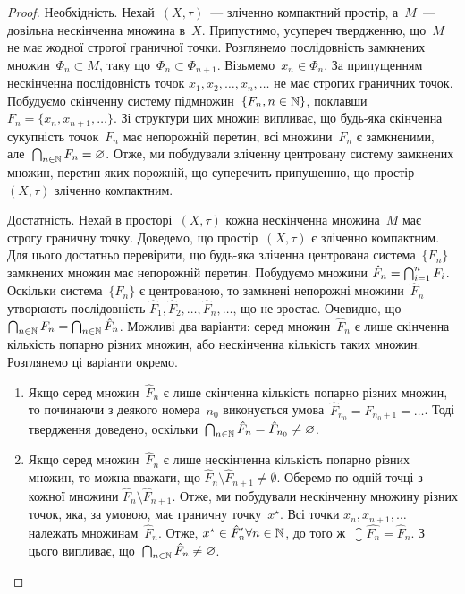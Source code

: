 \begin{proof}
Необхідність. Нехай~$(X, \tau)$~--- зліченно
компактний простір, а~$M$~--- довільна нескінченна множина
в~$X$. Припустимо, усупереч твердженню, що~$M$ не має
жодної строгої граничної точки. Розглянемо послідовність
замкнених множин~$\Phi_n \subset M$, таку що~$\Phi_n \subset \Phi_{n + 1}$.
Візьмемо~$x_n \in \Phi_n$.
За припущенням нескінченна послідовність точок
$x_1, x_2, \dots, x_n, \dots$ не має строгих граничних точок. Побудуємо
скінченну систему підмножин~$\{F_n, n \in \mathbb{N}\}$, поклавши
$F_n = \{x_n, x_{n+1}, \dots\}$. Зі структури цих множин випливає, що
будь-яка скінченна сукупність точок~$F_n$ має непорожній
перетин, всі множини~$F_n$ є замкненими,
але~$\operatorname*{\bigcap}_{n \in \mathbb{N}} F_n = \varnothing$.
Отже, ми побудували зліченну центровану систему
замкнених множин, перетин яких порожній, що суперечить
припущенню, що простір~$(X, \tau)$ зліченно компактним.

Достатність. Нехай в просторі~$(X, \tau)$ кожна
нескінченна множина~$M$ має строгу граничну точку.
Доведемо, що простір~$(X, \tau)$ є зліченно компактним. Для
цього достатньо перевірити, що будь-яка зліченна
центрована система~$\{F_n\}$ замкнених множин має
непорожній перетин. Побудуємо множини
$\hat F_n = \operatorname*{\bigcap}_{i = 1}^n F_i$.
Оскільки система~$\{F_n\}$ є центрованою, то замкнені
непорожні множини~$\hat F_n$ утворюють послідовність
$\hat F_1, \hat F_2, \dots, \hat F_n, \dots$, що не зростає.
Очевидно, що~$\operatorname*{\bigcap}_{n \in \mathbb{N}} F_n = \operatorname*{\bigcap}_{n \in \mathbb{N}} \hat F_n$.
Можливі два варіанти: серед множин~$\hat F_n$ є лише скінченна
кількість попарно різних множин, або нескінченна кількість
таких множин. Розглянемо ці варіанти окремо.
\begin{enumerate}
\item Якщо серед множин~$\hat F_n$ є лише скінченна кількість
попарно різних множин, то починаючи з деякого номера~$n_0$
виконується умова~$\hat F_{n_0} = \hat F_{n_0 + 1} = \dots$.
Тоді твердження доведено, оскільки~$\operatorname*{\bigcap}_{n \in \mathbb{N}} \hat F_n = \hat F_{n_0} \ne \varnothing$.

\item Якщо серед множин~$\hat F_n$
є лише нескінченна кількість
попарно різних множин, то можна вважати, що
$\hat F_n \setminus \hat F_{n + 1} \ne \emptyset$.
Оберемо по одній точці з кожної множини
$\hat F_n \setminus \hat F_{n + 1}$.
Отже, ми побудували нескінченну множину різних
точок, яка, за умовою, має граничну точку~$x^\star$. Всі точки
$x_n, x_{n + 1}, \dots$ належать множинам~$\hat F_n$. Отже,
$x^\star \in \hat F_n' \forall n \in \mathbb{N}$,
до того ж~$\closure{\hat{F_n}} = \hat F_n$.
З цього випливає, що~$\operatorname*{\bigcap}_{n \in \mathbb{N}} \hat F_n \ne \varnothing$. \qedhere
\end{enumerate}
\end{proof}

